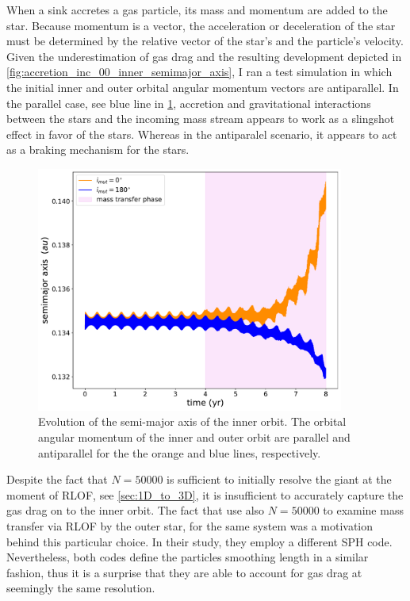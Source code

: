 When a sink accretes a gas particle, its mass and momentum are added to the star. Because momentum is a vector, the acceleration or deceleration of the star must be determined by the relative vector of the star's and the particle's velocity. Given the underestimation of gas drag and the resulting development depicted in \cref{fig:accretion_inc_00_inner_semimajor_axis}, I ran a test simulation in which the initial inner and outer orbital angular momentum vectors are antiparallel. In the parallel case, see blue line in \cref{fig:retro}, accretion and gravitational interactions between the stars and the incoming mass stream appears to work as a slingshot effect in favor of the stars. Whereas in the antiparalel scenario, it appears to act as a braking mechanism for the stars.
\begin{figure}[!htb]
    \centering
    \includegraphics[width=0.9\textwidth]{Thesis/graphs/accretion_inc_00_retro_inner_semimajor_axis.pdf}
    \caption{Evolution of the semi-major axis of the inner orbit. The orbital angular momentum of the inner and outer orbit are parallel and antiparallel for the the orange and blue lines, respectively.}
    \label{fig:retro}
\end{figure}

Despite the fact that $N=50000$ is sufficient to initially resolve the giant at the moment of RLOF, see \cref{sec:1D_to_3D}, it is insufficient to accurately capture the gas drag on to the inner orbit. The fact that \cite{de2014evolution} use also $N=50000$ to examine mass transfer via RLOF by the outer star, for the same system was a motivation behind this particular choice. In their study, they employ a different SPH code. Nevertheless, both codes define the particles smoothing length in a similar fashion, thus it is a surprise that they are able to account for gas drag at seemingly the same resolution. 

